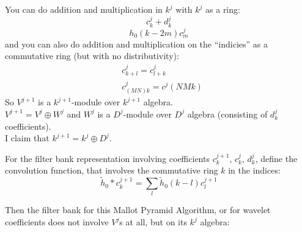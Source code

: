\documentclass[twoside]{amsart}
\theoremstyle{plain}
\theoremstyle{definition}
\theoremstyle{remark}
\numberwithin{equation}{section}
\begin{document}
You can do addition and multiplication in $k^j$ with $k^j$ as a ring: 
\[
c^j_k + d^j_k
\]
\[
h_0(k-2m)c_m^j
\]
and you can also do addition and multiplication on the ``indicies'' as a commutative ring (but with no distributivity):
\[
\begin{aligned}
  & c^j_{k+l} = c^j_{l+k} \\ 
  & c^j_{(MN)k} = c^j{(NMk)}
\end{aligned}
\]
So $V^{j+1}$ is a $k^{j+1}$-module over $k^{j+1}$ algebra.  \\
$V^{j+1} = V^j\oplus W^j$ and $W^j$ is a $D^j$-module over $D^j$ algebra (consisting of $d^j_k$ coefficients).  \\
I claim that $k^{j+1} = k^j\oplus D^j$.  

For the filter bank representation involving coefficients $c_k^{j+1}$, $c_k^j$, $d_k^j$, define the convolution function, that involves the commutative ring $k$ in the indices:
\[
\widetilde{h}_0* c_k^{j+1} = \sum_l \widetilde{h}_0(k-l)c_l^{j+1}
\]

Then the filter bank for this Mallot Pyramid Algorithm, or for wavelet coefficients does not involve $V^j$s at all, but on its $k^j$ algebra:

\end{document}
